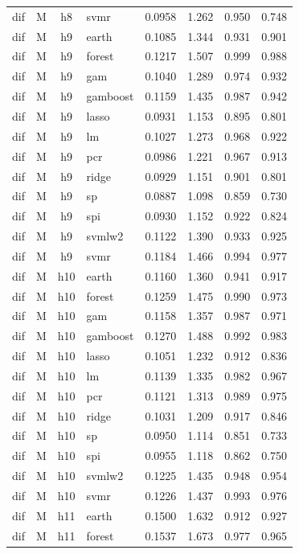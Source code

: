 \begin{ThreePartTable}
\begin{longtable}[t]{llclcccc}
dif & M & h8 & svmr & 0.0958 & 1.262 & 0.950 & 0.748\\
\addlinespace
dif & M & h9 & earth & 0.1085 & 1.344 & 0.931 & 0.901\\
dif & M & h9 & forest & 0.1217 & 1.507 & 0.999 & 0.988\\
dif & M & h9 & gam & 0.1040 & 1.289 & 0.974 & 0.932\\
dif & M & h9 & gamboost & 0.1159 & 1.435 & 0.987 & 0.942\\
dif & M & h9 & lasso & 0.0931 & 1.153 & 0.895 & 0.801\\
dif & M & h9 & lm & 0.1027 & 1.273 & 0.968 & 0.922\\
dif & M & h9 & pcr & 0.0986 & 1.221 & 0.967 & 0.913\\
dif & M & h9 & ridge & 0.0929 & 1.151 & 0.901 & 0.801\\
dif & M & h9 & sp & 0.0887 & 1.098 & 0.859 & 0.730\\
dif & M & h9 & spi & 0.0930 & 1.152 & 0.922 & 0.824\\
dif & M & h9 & svmlw2 & 0.1122 & 1.390 & 0.933 & 0.925\\
dif & M & h9 & svmr & 0.1184 & 1.466 & 0.994 & 0.977\\
\addlinespace
dif & M & h10 & earth & 0.1160 & 1.360 & 0.941 & 0.917\\
dif & M & h10 & forest & 0.1259 & 1.475 & 0.990 & 0.973\\
dif & M & h10 & gam & 0.1158 & 1.357 & 0.987 & 0.971\\
dif & M & h10 & gamboost & 0.1270 & 1.488 & 0.992 & 0.983\\
dif & M & h10 & lasso & 0.1051 & 1.232 & 0.912 & 0.836\\
dif & M & h10 & lm & 0.1139 & 1.335 & 0.982 & 0.967\\
dif & M & h10 & pcr & 0.1121 & 1.313 & 0.989 & 0.975\\
dif & M & h10 & ridge & 0.1031 & 1.209 & 0.917 & 0.846\\
dif & M & h10 & sp & 0.0950 & 1.114 & 0.851 & 0.733\\
dif & M & h10 & spi & 0.0955 & 1.118 & 0.862 & 0.750\\
dif & M & h10 & svmlw2 & 0.1225 & 1.435 & 0.948 & 0.954\\
dif & M & h10 & svmr & 0.1226 & 1.437 & 0.993 & 0.976\\
\addlinespace
dif & M & h11 & earth & 0.1500 & 1.632 & 0.912 & 0.927\\
dif & M & h11 & forest & 0.1537 & 1.673 & 0.977 & 0.965\\

\end{longtable}
\end{ThreePartTable}

